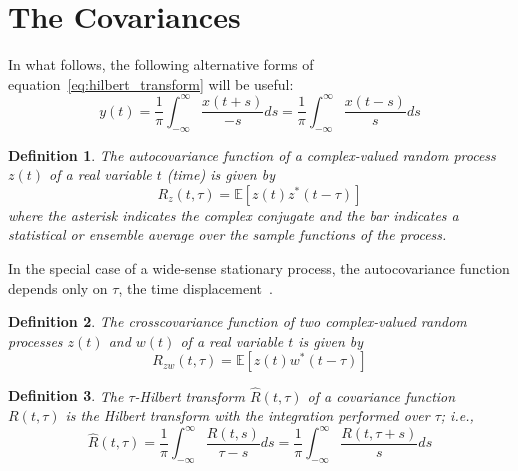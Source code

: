 \documentclass{article}
\newcommand{\tmem}[1]{{\em #1\/}}
\newtheorem{definition}{Definition}
\begin{document}
\section{The Covariances}

In what follows, the following alternative forms of
equation~\eqref{eq:hilbert_transform} will be useful:
\begin{equation}
  y (t) = \frac{1}{\pi}  \int_{- \infty}^{\infty} \frac{x (t + s)}{- s} ds =
  \frac{1}{\pi}  \int_{- \infty}^{\infty} \frac{x (t - s)}{s} ds
  \label{eq:hilbert_transform_alt}
\end{equation}
\begin{definition}
  \label{def:autocovariance}The {\tmem{autocovariance function}} of a
  complex-valued random process $z (t)$ of a real variable $t$ (time) is given
  by
  \begin{equation}
    R_z (t, \tau) =\mathbb{E} [z (t) z^{\ast} (t - \tau)]
    \label{eq:autocovariance}
  \end{equation}
  where the asterisk indicates the complex conjugate and the bar indicates a
  statistical or ensemble average over the sample functions of the process.
\end{definition}

In the special case of a wide-sense stationary process, the autocovariance
function depends only on $\tau$, the time displacement~{\cite{doob1953}}.

\begin{definition}
  \label{def:crosscovariance}The {\tmem{crosscovariance function}} of two
  complex-valued random processes $z (t)$ and $w (t)$ of a real variable $t$
  is given by
  \begin{equation}
    R_{zw} (t, \tau) =\mathbb{E} [z (t) w^{\ast} (t - \tau)]
    \label{eq:crosscovariance}
  \end{equation}
\end{definition}

\begin{definition}
  \label{def:hilbert_covariance}The $\tau$-Hilbert transform $\hat{R} (t,
  \tau)$ of a covariance function $R (t, \tau)$ is the Hilbert transform with
  the integration performed over $\tau$; i.e.,
  \begin{equation}
    \hat{R} (t, \tau) = \frac{1}{\pi}  \int_{- \infty}^{\infty} \frac{R (t,
    s)}{\tau - s} ds = \frac{1}{\pi}  \int_{- \infty}^{\infty} \frac{R (t,
    \tau + s)}{s} ds \label{eq:hilbert_covariance}
  \end{equation}
\end{definition}
\end{document}

